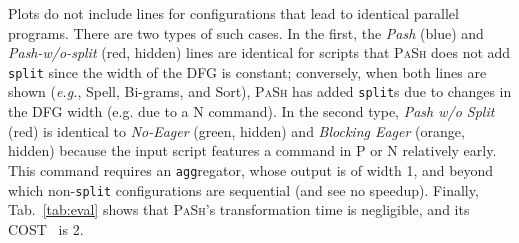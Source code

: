 \documentclass[sigplan, review, screen, anonymous]{acmart}
\newcommand{\eg}{{\em e.g.}, }
\newcommand{\etc}{{\em etc.}\xspace}
\newcommand{\ttt}[1]{\texttt{#1}}
\newcommand{\cn}[1]{\mbox{\textcircled{\footnotesize #1}}}
\newcommand{\pur}{\cn{\textsc{P}}\xspace}
\newcommand{\npu}{\cn{\textsc{N}}\xspace}
\newcommand{\todo}[1]{\hl{#1}\xspace}
\newcommand{\cf}[1]{(\emph{Cf}.\S\ref{#1})}
\newcommand{\sys}{{\scshape PaSh}\xspace}
\begin{document}
Plots do not include lines for configurations that lead to identical parallel programs.
There are two types of such cases. %
In the first, the \emph{Pash} (blue) and \emph{Pash-w/o-split} (red, hidden) lines are identical for scripts that \sys does not add \ttt{split} since the width of the DFG is constant;
  conversely, when both lines are shown (\eg Spell, Bi-grams, and Sort), \sys has added \ttt{split}s due to changes in the DFG width (e.g. due to a \npu command).
In the second type, \emph{Pash w/o Split} (red) is identical to \emph{No-Eager} (green, hidden) and \emph{Blocking Eager} (orange, hidden) because the input script features a command in \pur or \npu relatively early.
This command requires an \ttt{agg}regator, whose output is of width 1, and beyond which non-\ttt{split} configurations are sequential (and see no speedup).
Finally, Tab.~\ref{tab:eval} shows that \sys's transformation time is negligible, and its COST~\cite{mcsherryscalability} is 2. %



  
\end{document}
